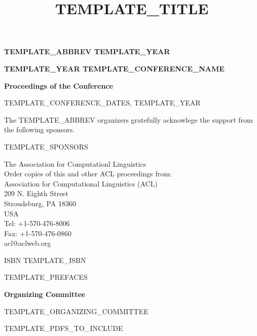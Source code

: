 \documentclass[10pt]{article}
\date{}
\title{TEMPLATE_TITLE}
\begin{document}
\begin{titlepage}
   \begin{center}
       \vspace{1cm}

       \textbf{TEMPLATE_ABBREV TEMPLATE_YEAR}

       \vspace{4cm}

       \textbf{TEMPLATE_YEAR TEMPLATE_CONFERENCE_NAME}

       \vfill

       \textbf{Proceedings of the Conference}

       \vspace{5cm}


       TEMPLATE_CONFERENCE_DATES, TEMPLATE_YEAR

   \end{center}
\end{titlepage}
\newpage

\setcounter{page}{2}
The TEMPLATE_ABBREV organizers gratefully acknowlege the support from the following sponsors.

\bigskip
TEMPLATE_SPONSORS

\newpage


\textcopyright The Association for Computationl Linguistics\\
\vspace{5cm}
Order copies of this and other ACL proceedings from:\\

Association for Computational Linguistics (ACL)\\
209 N. Eighth Street\\
Stroudsburg, PA 18360\\
USA\\
Tel: +1-570-476-8006\\
Fax: +1-570-476-0860\\
acl@aclweb.org\\

\vspace{5cm}

ISBN TEMPLATE_ISBN
\newpage


TEMPLATE_PREFACES
\newpage


\begin{center}
\textbf{Organizing Committee}
\end{center}
TEMPLATE_ORGANIZING_COMMITTEE
\newpage

\pagestyle{plain}
\tableofcontents
\newpage

\setcounter{page}{1}

TEMPLATE_PDFS_TO_INCLUDE
\end{document}

